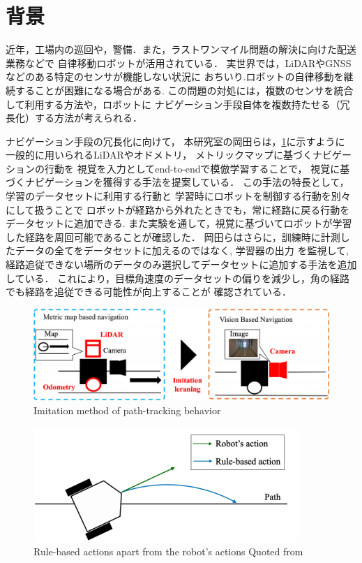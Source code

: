 
\section{背景}
近年，工場内の巡回や，警備．また，ラストワンマイル問題の解決に向けた配送業務などで
自律移動ロボットが活用されている．
実世界では，LiDARやGNSSなどのある特定のセンサが機能しない状況に
おちいり.ロボットの自律移動を継続することが困難になる場合がある.
この問題の対処には，複数のセンサを統合して利用する方法や，ロボットに
ナビゲーション手段自体を複数持たせる（冗長化）する方法が考えられる．

ナビゲーション手段の冗長化に向けて，
本研究室の岡田らは，\ref{fig:imi_abs}に示すように
一般的に用いられるLiDARやオドメトリ，
メトリックマップに基づくナビゲーションの行動を
視覚を入力としてend-to-endで模倣学習することで，
視覚に基づくナビゲーションを獲得する手法を提案している．
この手法の特長として，学習のデータセットに利用する行動と
学習時にロボットを制御する行動を別々にして扱うことで
ロボットが経路から外れたときでも，常に経路に戻る行動をデータセットに追加できる.
また実験を通して，視覚に基づいてロボットが学習した経路を周回可能であることが確認した．
岡田らはさらに，訓練時に計測したデータの全てをデータセットに加えるのではなく, 学習器の出力
を監視して, 経路追従できない場所のデータのみ選択してデータセットに追加する手法を追加している．
これにより，目標角速度のデータセットの偏りを減少し，角の経路でも経路を追従できる可能性が向上することが
確認されている．
\begin{figure}[htbp]
     \centering
      \includegraphics[width=130mm]{images/pdf/imi_abs.pdf}
      \caption{Imitation method of path-tracking behavior}\label{fig:imi_abs}
 \end{figure}

 \begin{figure}[htbp]
     \centering
      \includegraphics[width=100mm]{images/pdf/robo_action.pdf}
      \caption{Rule-based actions
      apart from the robot's actions Quoted from\cite{okada2020}}
      \label{fig:robo_ac}
 \end{figure}

